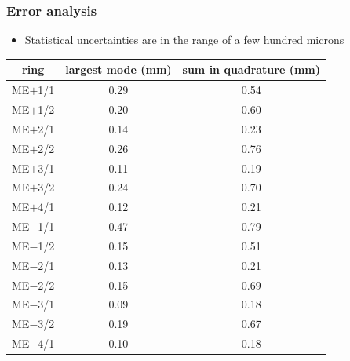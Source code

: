 \documentclass[compress]{beamer}
\begin{document}
\begin{frame}
\frametitle{Error analysis}

\begin{itemize}
\item Statistical uncertainties are in the range of a few hundred microns
\end{itemize}

\begin{center}\begin{tabular}{c c c}
\hline\hline
ring & largest mode (mm) & sum in quadrature (mm) \\\hline
ME$+$1/1 & 0.29 & 0.54 \\
ME$+$1/2 & 0.20 & 0.60 \\
ME$+$2/1 & 0.14 & 0.23 \\
ME$+$2/2 & 0.26 & 0.76 \\
ME$+$3/1 & 0.11 & 0.19 \\
ME$+$3/2 & 0.24 & 0.70 \\
ME$+$4/1 & 0.12 & 0.21 \\\hline
ME$-$1/1 & 0.47 & 0.79 \\
ME$-$1/2 & 0.15 & 0.51 \\
ME$-$2/1 & 0.13 & 0.21 \\
ME$-$2/2 & 0.15 & 0.69 \\
ME$-$3/1 & 0.09 & 0.18 \\
ME$-$3/2 & 0.19 & 0.67 \\
ME$-$4/1 & 0.10 & 0.18 \\\hline\hline
\end{tabular}\end{center}
\end{frame}

\end{document}
